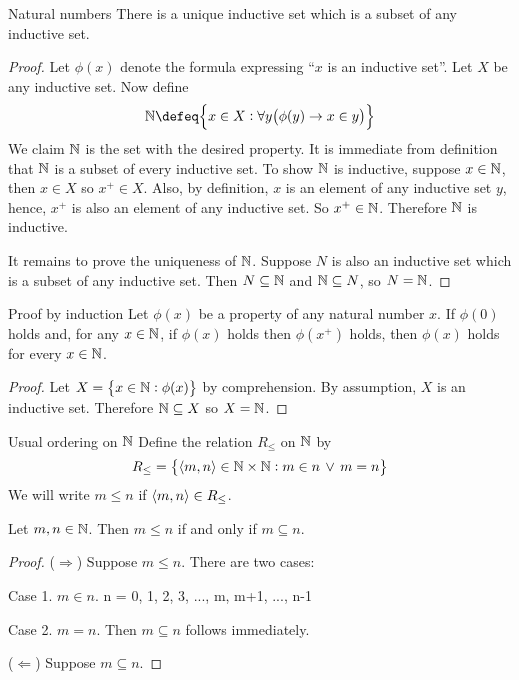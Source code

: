 \documentclass{styles/tufte}
\begin{document}
\begin{theorem}{Natural numbers}{}
  \vspace{-0.25em}
  There is a unique inductive set which is a subset of any inductive set.
\end{theorem}
\begin{proof}
  Let $\phi(x)$ denote the formula expressing ``$x$ is an inductive set''. Let $X$ be any inductive set. Now define
  \[ \NN \defeq \set{x \in X: \forall y \left(\phi(y) \implies x \in y\right)} \]
  We claim $\mathbb{N}$ is the set with the desired property. It is immediate from definition that $\mathbb{N}$ is a subset of every inductive set. To show $\mathbb{N}$ is inductive, suppose $x \in \mathbb{N}$, then $x \in X$ so $x^+ \in X$. Also, by definition, $x$ is an element of any inductive set $y$, hence, $x^+$ is also an element of any inductive set. So $x^+ \in \mathbb{N}$. Therefore $\mathbb{N}$ is inductive.
  
  It remains to prove the uniqueness of $\mathbb{N}$. Suppose $N$ is also an inductive set which is a subset of any inductive set. Then $N \subseteq \mathbb{N}$ and $\mathbb{N} \subseteq N$, so $N = \mathbb{N}$.
\end{proof}

\begin{theorem}{Proof by induction}{}
  Let $\phi(x)$ be a property of any natural number $x$. If $\phi(0)$ holds and, for any $x \in \mathbb{N}$, if $\phi(x)$ holds then $\phi(x^+)$ holds, then $\phi(x)$ holds for every $x \in \mathbb{N}$.
\end{theorem}
\begin{proof}
  Let $X = \set{x \in \NN: \phi(x)}$ by comprehension. By assumption, $X$ is an inductive set. Therefore $\mathbb{N} \subseteq X$ so $X = \mathbb{N}$.
\end{proof}

\begin{definition}{Usual ordering on $\mathbb{N}$}{}
  Define the relation $R_\leq$ on $\mathbb{N}$ by
  \[ R_\leq = \set{\opair{m, n} \in \NN \times \NN: m \in n \,\lor\, m = n} \]
  We will write $m \leq n$ if $\langle m, n\rangle \in R_\leq$.
\end{definition}

\begin{proposition}{}{}
  Let $m, n \in \mathbb{N}$. Then $m \leq n$ if and only if $m \subseteq n$.
\end{proposition}
\begin{proof}
  ($\Rightarrow$) Suppose $m \leqslant n$. There are two cases:
  \begin{description}
    \item{Case 1.} $m \in n$. n = {0, 1, 2, 3, ..., m, m+1, ..., n-1}
    \item{Case 2.} $m = n$. Then $m \subseteq n$ follows immediately.
  \end{description}
  
  ($\Leftarrow$) Suppose $m \subseteq n$.
\end{proof}
\end{document}
